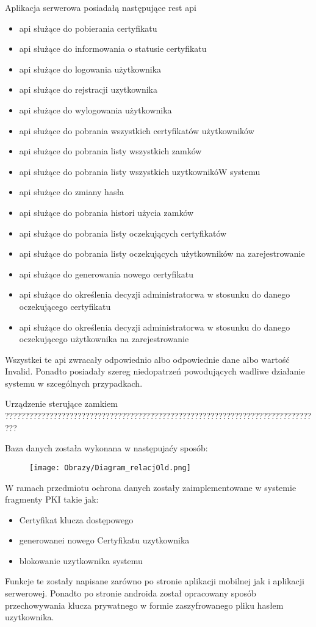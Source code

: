     Aplikacja serwerowa posiadałą następujące rest api
    \begin{itemize}
    	\item api służące do pobierania certyfikatu
    	\item api służące do informowania o statusie certyfikatu
    	\item api służące do logowania użytkownika
    	\item api służące do rejstracji uzytkownika
    	\item api służące do wylogowania użytkownika
    	\item api służące do pobrania wszystkich certyfikatów użytkowników
    	\item api służące do pobrania listy wszystkich zamków
    	\item api służące do pobrania listy wszystkich uzytkownikóW systemu
    	\item api służące do zmiany hasła
    	\item api służące do pobrania histori użycia zamków
    	\item api służące do pobrania listy oczekujących certyfikatów
    	\item api służące do pobrania listy oczekujących użytkowników na zarejestrowanie
    	\item api służące do generowania nowego certyfikatu
    	\item api służące do określenia decyzji administratorwa w stosunku do danego oczekującego certyfikatu
    	\item api służące do określenia decyzji administratorwa w stosunku do danego oczekującego użytkownika na zarejestrowanie 
    \end{itemize}   
	Wszystkei te api zwracały odpowiednio albo odpowiednie dane albo wartość Invalid. Ponadto posiadały szereg niedopatrzeń powodujących wadliwe działanie systemu w szcególnych przypadkach. 
	
	Urządzenie sterujące zamkiem
	???????????????????????????????????????????????????????????????????????????????
	
	Baza danych została wykonana w następujaćy sposób: 
	
		\begin{figure}[!h]
		\centering
		\texttt{[image: Obrazy/Diagram\_relacjOld.png]}
		\label{diagram:diagram relacji}
	\end{figure}

	W ramach przedmiotu ochrona danych zostały zaimplementowane w systemie fragmenty PKI takie jak:
	   \begin{itemize}
	   	\item Certyfikat klucza dostępowego
	   	\item  generowanei nowego Certyfikatu uzytkownika
	   	\item blokowanie uzytkownika systemu
	   \end{itemize}
	 Funkcje te zostały napisane zarówno po stronie aplikacji mobilnej jak i aplikacji serwerowej. Ponadto po stronie androida został opracowany sposób przechowywania klucza prywatnego w formie zaszyfrowanego pliku hasłem uzytkownika.
